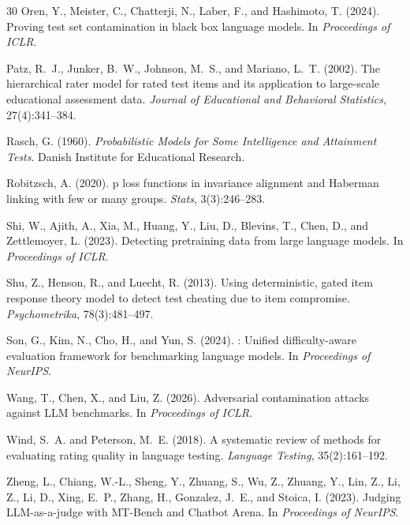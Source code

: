\documentclass[letterpaper,11pt]{article}
\begin{document}
\begin{thebibliography}{30}
Oren, Y., Meister, C., Chatterji, N., Laber, F., and Hashimoto, T. (2024).
\newblock Proving test set contamination in black box language models.
\newblock In \emph{Proceedings of ICLR}.

Patz, R.~J., Junker, B.~W., Johnson, M.~S., and Mariano, L.~T. (2002).
\newblock The hierarchical rater model for rated test items and its application to large-scale educational assessment data.
\newblock \emph{Journal of Educational and Behavioral Statistics}, 27(4):341--384.

Rasch, G. (1960).
\newblock \emph{Probabilistic Models for Some Intelligence and Attainment Tests}.
\newblock Danish Institute for Educational Research.

Robitzsch, A. (2020).
p loss functions in invariance alignment and {Haberman} linking with few or many groups.
\newblock \emph{Stats}, 3(3):246--283.

Shi, W., Ajith, A., Xia, M., Huang, Y., Liu, D., Blevins, T., Chen, D., and Zettlemoyer, L. (2023).
\newblock Detecting pretraining data from large language models.
\newblock In \emph{Proceedings of ICLR}.

Shu, Z., Henson, R., and Luecht, R. (2013).
\newblock Using deterministic, gated item response theory model to detect test cheating due to item compromise.
\newblock \emph{Psychometrika}, 78(3):481--497.

Son, G., Kim, N., Cho, H., and Yun, S. (2024).
: Unified difficulty-aware evaluation framework for benchmarking language models.
\newblock In \emph{Proceedings of NeurIPS}.

Wang, T., Chen, X., and Liu, Z. (2026).
\newblock Adversarial contamination attacks against {LLM} benchmarks.
\newblock In \emph{Proceedings of ICLR}.

Wind, S.~A. and Peterson, M.~E. (2018).
\newblock A systematic review of methods for evaluating rating quality in language testing.
\newblock \emph{Language Testing}, 35(2):161--192.

Zheng, L., Chiang, W.-L., Sheng, Y., Zhuang, S., Wu, Z., Zhuang, Y., Lin, Z., Li, Z., Li, D., Xing, E.~P., Zhang, H., Gonzalez, J.~E., and Stoica, I. (2023).
\newblock Judging {LLM}-as-a-judge with {MT}-{Bench} and {Chatbot Arena}.
\newblock In \emph{Proceedings of NeurIPS}.

\end{thebibliography}
\end{document}
